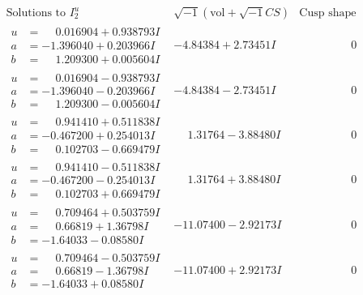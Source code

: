 \documentclass[1p]{elsarticle_modified}
\theoremstyle{definition}
\newcommand{\I}{\sqrt{-1}}
\begin{document}
$$\begin{array}{c|c|c}  
\text{Solutions to }I^u_{2}& \I (\text{vol} + \sqrt{-1}CS) & \text{Cusp shape}\\
 \hline 
\begin{aligned}
u &= \phantom{-}0.016904 + 0.938793 I \\
a &= -1.396040 + 0.203966 I \\
b &= \phantom{-}1.209300 + 0.005604 I\end{aligned}
 & -4.84384 + 2.73451 I & \phantom{-0.000000 } 0 \\ \hline\begin{aligned}
u &= \phantom{-}0.016904 - 0.938793 I \\
a &= -1.396040 - 0.203966 I \\
b &= \phantom{-}1.209300 - 0.005604 I\end{aligned}
 & -4.84384 - 2.73451 I & \phantom{-0.000000 } 0 \\ \hline\begin{aligned}
u &= \phantom{-}0.941410 + 0.511838 I \\
a &= -0.467200 + 0.254013 I \\
b &= \phantom{-}0.102703 - 0.669479 I\end{aligned}
 & \phantom{-}1.31764 - 3.88480 I & \phantom{-0.000000 } 0 \\ \hline\begin{aligned}
u &= \phantom{-}0.941410 - 0.511838 I \\
a &= -0.467200 - 0.254013 I \\
b &= \phantom{-}0.102703 + 0.669479 I\end{aligned}
 & \phantom{-}1.31764 + 3.88480 I & \phantom{-0.000000 } 0 \\ \hline\begin{aligned}
u &= \phantom{-}0.709464 + 0.503759 I \\
a &= \phantom{-}0.66819 + 1.36798 I \\
b &= -1.64033 - 0.08580 I\end{aligned}
 & -11.07400 - 2.92173 I & \phantom{-0.000000 } 0 \\ \hline\begin{aligned}
u &= \phantom{-}0.709464 - 0.503759 I \\
a &= \phantom{-}0.66819 - 1.36798 I \\
b &= -1.64033 + 0.08580 I\end{aligned}
 & -11.07400 + 2.92173 I & \phantom{-0.000000 } 0 \\ \hline\begin{aligned}

\end{aligned}
\end{array}$$
\end{document}

